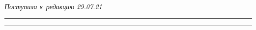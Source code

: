 










\vspace*{-6pt}





\hfill{\small\textit{Поступила в~редакцию 29.07.21}}





\vspace*{6pt}





\hrule





\vspace*{2pt}















\hrule





\vspace*{8pt}





\def\tit{OPTIMIZATION PROCESS OF~THE~INTEGRATED PLANT 


PROTECTION METHOD FOR~DOT MODELS}











\def\titkol{Optimization process of~the~integrated plant 


protection method for~dot models}





\def\aut{R.\,N.~Odinaev, P.\,L.~Nazrulloev, and~F.~Raimzoda}





\def\autkol{R.\,N.~Odinaev, P.\,L.~Nazrulloev, and~F.~Raimzoda}





